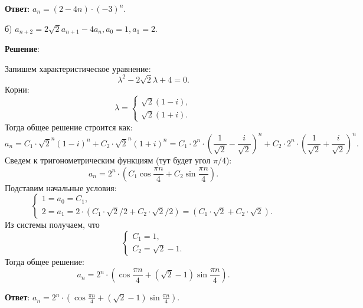 \documentclass{article}
\begin{document}
\begin{enumerate}
    \textbf{Ответ}:
    $a_n = (2 - 4n)\cdot (-3)^n.$
    
    б) $a_{n+2} = 2\sqrt{2}a_{n+1} - 4a_n, a_0 = 1, a_1 = 2.$

    \textbf{Решение}:

    Запишем характеристическое уравнение:
    \begin{equation}
      \lambda^2 - 2\sqrt{2} \lambda + 4 = 0.
    \end{equation}
    Корни:
    \begin{equation}
      \lambda = \begin{cases}
        \sqrt{2} (1-i), \\
        \sqrt{2} (1+i).
      \end{cases}
    \end{equation}
    Тогда общее решение строится как:
    \begin{equation}
      a_n = C_1 \cdot \sqrt{2}^n (1-i)^n + C_2 \cdot \sqrt{2}^n (1+i)^n = C_1 \cdot 2^n \cdot \left(\frac{1}{\sqrt{2}}-\frac{i}{\sqrt{2}}\right)^n + C_2 \cdot 2^n \cdot \left(\frac{1}{\sqrt{2}}+\frac{i}{\sqrt{2}}\right)^n.
    \end{equation}
    Сведем к тригонометрическим функциям (тут будет угол $\pi/4$):
    \begin{equation}
      a_n = 2^n \cdot \left(C_1 \cos \frac{\pi n}{4} + C_2 \sin \frac{\pi n}{4}\right).
    \end{equation}
    Подставим начальные условия:
    \begin{equation}
      \begin{cases}
        1 = a_0 = C_1, \\
        2 = a_1 = 2 \cdot (C_1 \cdot \sqrt{2}/2 + C_2 \cdot \sqrt{2}/2) = (C_1 \cdot \sqrt{2} + C_2 \cdot \sqrt{2}).
      \end{cases}
    \end{equation}
    Из системы получаем, что
    \begin{equation}
      \begin{cases}
        C_1 = 1, \\
        C_2 = \sqrt{2} - 1.
      \end{cases}
    \end{equation}
    Тогда общее решение:
    \begin{equation}
      a_n = 2^n \cdot \left(\cos \frac{\pi n}{4} + \left(\sqrt{2} - 1\right) \sin \frac{\pi n}{4}\right).
    \end{equation}

    \textbf{Ответ}:
    $a_n = 2^n \cdot \left(\cos \frac{\pi n}{4} + \left(\sqrt{2} - 1\right) \sin \frac{\pi n}{4}\right).$


\end{enumerate}
\end{document}
